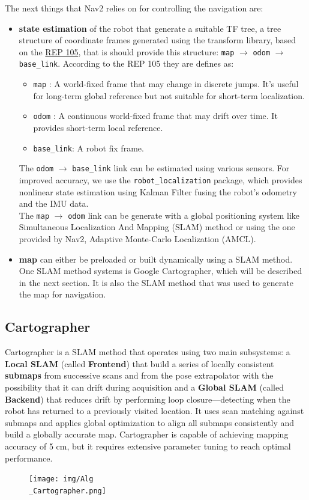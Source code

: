 The next things that Nav2 relies on for controlling the navigation are:
\begin{itemize}
	\item \textbf{state estimation} of the robot that generate a suitable TF tree\label{TF_tree_nav2}, a tree structure of coordinate frames generated using the transform library\cite{6556373}, based on the \href{https://www.ros.org/reps/rep-0105.html}{REP 105}, that is should provide this structure: \texttt{map} $\rightarrow$ \texttt{odom} $\rightarrow$ \texttt{base\_link}. According to the REP 105 they are defines as:
	\begin{itemize}
		\item \texttt{map} : A world-fixed frame that may change in discrete jumps. It's useful for long-term global reference but not suitable for short-term localization.
		\item \texttt{odom} : A continuous world-fixed frame that may drift over time. It provides short-term local reference.
		\item \texttt{base\_link}: A robot fix frame.
	\end{itemize}
	The \texttt{odom} $\rightarrow$ \texttt{base\_link} link \label{ref_odom_to_base}can be estimated using various sensors. For improved accuracy, we use the \texttt{robot\_localization} package\cite{MooreStouchKeneralizedEkf2014}, which provides nonlinear state estimation using Kalman Filter fusing the robot's odometry and the IMU data.\\
	The \texttt{map} $\rightarrow$ \texttt{odom} link can be generate with a global positioning system like Simultaneous Localization And Mapping (SLAM) method\cite{sh-p1-prelude} or using the one provided by Nav2, Adaptive Monte-Carlo Localization (AMCL). \label{ref_map_to_odom}
	\item \textbf{map} can either be preloaded or built dynamically using a SLAM method. One SLAM method systems is Google Cartographer, which will be described in the next section. It is also the SLAM method that was used to generate the map for navigation.
\end{itemize}
\subsection{Cartographer}
Cartographer\cite{45466} is a SLAM method that operates using two main subsystems: a \textbf{Local SLAM} (called \textbf{Frontend}) that build a series of locally consistent \textbf{submaps} from successive scans and from the pose extrapolator with the possibility that it can drift during acquisition and a \textbf{Global SLAM} (called \textbf{Backend}) that reduces drift by performing loop closure—detecting when the robot has returned to a previously visited location. It uses scan matching against submaps and applies global optimization to align all submaps consistently and build a globally accurate map. Cartographer is capable of achieving mapping accuracy of 5 cm, but it requires extensive parameter tuning to reach optimal performance. 
\begin{figure}[h]
	\centering
	\texttt{[image: img/Alg\\\_Cartographer.png]}
\end{figure}
